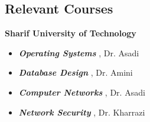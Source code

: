 \documentclass[../main.tex]{subfiles}
\begin{document}
\begin{category}
\section{Relevant Courses}
    \citembullet \textbf{Sharif University of Technology}
    \begin{itemize}  
        \item \textbf{\emph{Operating Systems}} , Dr. Asadi
        \item \textbf{\emph{Database Design}} , Dr. Amini
        \item \textbf{\emph{Computer Networks}} , Dr. Asadi
        \item \textbf{\emph{Network Security}} , Dr. Kharrazi
    \\[-5pt]
    \end{itemize}
\end{category}
\end{document}
